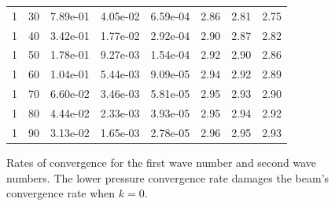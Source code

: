 \documentclass[8pt]{beamer}
\begin{document}
\begin{frame}
\begin{figure}
\begin{tabular}{| l | l | l | l | l | l | l | l |}
            1 & 30 & 7.89e-01 & 4.05e-02 & 6.59e-04 & 2.86 & 2.81 & 2.75      \\
            1 & 40 & 3.42e-01 & 1.77e-02 & 2.92e-04 & 2.90 & 2.87 & 2.82      \\
            1 & 50 & 1.78e-01 & 9.27e-03 & 1.54e-04 & 2.92 & 2.90 & 2.86      \\
            1 & 60 & 1.04e-01 & 5.44e-03 & 9.09e-05 & 2.94 & 2.92 & 2.89      \\
            1 & 70 & 6.60e-02 & 3.46e-03 & 5.81e-05 & 2.95 & 2.93 & 2.90      \\
            1 & 80 & 4.44e-02 & 2.33e-03 & 3.93e-05 & 2.95 & 2.94 & 2.92      \\
            1 & 90 & 3.13e-02 & 1.65e-03 & 2.78e-05 & 2.96 & 2.95 & 2.93      \\
            \hline
        \end{tabular}
        \caption{Rates of convergence for the first wave number and second wave
        numbers. The lower pressure convergence rate damages the beam's
        convergence rate when \(k = 0\).}
    \end{figure}
\end{frame}
\end{document}
